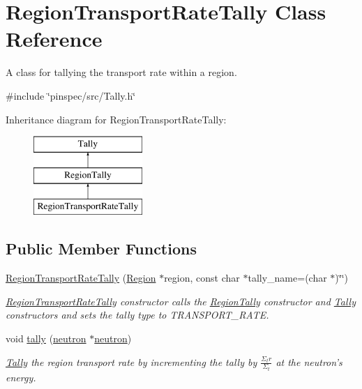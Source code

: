 \hypertarget{classRegionTransportRateTally}{\section{Region\-Transport\-Rate\-Tally Class Reference}
\label{classRegionTransportRateTally}
}


A class for tallying the transport rate within a region.  




{\ttfamily \#include \char`\"{}pinspec/src/\-Tally.\-h\char`\"{}}

Inheritance diagram for Region\-Transport\-Rate\-Tally\-:\begin{figure}[H]
\begin{center}
\leavevmode
\includegraphics[height=3.000000cm]{classRegionTransportRateTally}
\end{center}
\end{figure}
\subsection*{Public Member Functions}
\begin{DoxyCompactItemize}
\item 
\hyperlink{classRegionTransportRateTally_a7be90fefee298aad00612fdad134a6ea}{Region\-Transport\-Rate\-Tally} (\hyperlink{classRegion}{Region} $\ast$region, const char $\ast$tally\-\_\-name=(char $\ast$)\char`\"{}\char`\"{})
\begin{DoxyCompactList}\small\item\em \hyperlink{classRegionTransportRateTally}{Region\-Transport\-Rate\-Tally} constructor calls the \hyperlink{classRegionTally}{Region\-Tally} constructor and \hyperlink{classTally}{Tally} constructors and sets the tally type to T\-R\-A\-N\-S\-P\-O\-R\-T\-\_\-\-R\-A\-T\-E. \end{DoxyCompactList}\item 
void \hyperlink{classRegionTransportRateTally_af373747c50c56011383dcf569a685af2}{tally} (\hyperlink{structneutron}{neutron} $\ast$\hyperlink{structneutron}{neutron})
\begin{DoxyCompactList}\small\item\em \hyperlink{classTally}{Tally} the region transport rate by incrementing the tally by $ \frac{\Sigma_tr}{\Sigma_t} $ at the neutron's energy. \end{DoxyCompactList}\end{DoxyCompactItemize}
